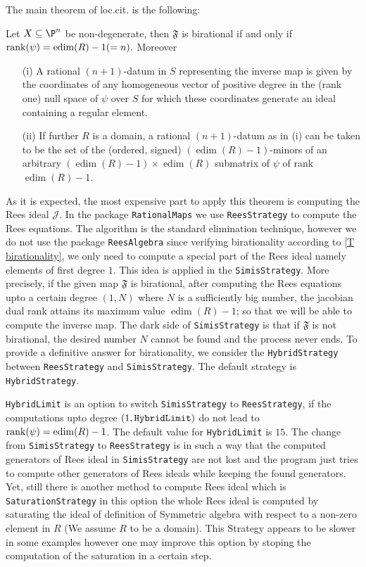 \documentclass[11pt]{amsart}
\numberwithin{equation}{theorem}
\renewcommand{\:}{\colon}
\DeclareMathOperator{\edim}{edim}
\theoremstyle{theorem}
\begin{document}
The main theorem of loc.cit. is the following:
\begin{theorem} \label{T birationality}Let $X\subseteq \P^n$ be non-degenerate, then $\mathfrak{F}$ is birational if and only if ${\rm rank}(\psi)=\edim(R)-1(=n).$
Moreover
\begin{enumerate}
\item[{\rm (i)}] A rational $(n+1)$-datum in
$S$ representing the inverse map is given by the coordinates of any homogeneous vector of positive degree
in the {\rm (}rank one{\rm )} null space of $\psi$ over $S$ for which these coordinates generate an ideal containing
a regular element.

\item[{\rm (ii)}] If further $R$ is a domain, a rational $(n+1)$-datum as in {\rm (i)}
can be taken to be the set of the {\rm (}ordered, signed{\rm )} $(\edim(R)-1)$-minors
of an arbitrary $(\edim(R)-1)\times \edim(R)$ submatrix of $\psi$ of rank $\edim(R)-1$.
\end{enumerate}

\end{theorem}
As it is expected, the most expensive part to apply this theorem is computing the Rees ideal ${\mathcal J}$. In the package {\tt RationalMaps} we use {\tt ReesStrategy} to compute the Rees equations. The algorithm is the standard elimination technique, however we do not use the package {\tt ReesAlgebra} since verifying birationality according to \autoref{T birationality}, we only need to compute a special part of the Rees ideal namely elements of first degree $1$. This idea is applied in the {\tt SimisStrategy}. More precisely, if the given map $\mathfrak{F}$ is birational, after computing the Rees equations upto a certain degree $(1,N)$ where $N$ is a sufficiently big number, the jacobian dual rank attains its maximum value $\edim(R)-1$; so that we will be able to compute the inverse map.  The dark side of {\tt SimisStrategy} is that if $\mathfrak{F}$ is not birational,  the desired number $N$ cannot be found and the process never ends. To provide a definitive answer for birationality,  we consider the {\tt HybridStrategy}  between {\tt ReesStrategy} and {\tt SimisStrategy}.  The default strategy is {\tt HybridStrategy}.

{\tt HybridLimit} is an option to switch   {\tt SimisStrategy} to  {\tt{ReesStrategy}}, if the computations upto degree $(1, \tt{HybridLimit})$ do not lead to   ${\rm rank}(\psi)=\edim(R)-1$.
The default value for {\tt HybridLimit} is $15$. The change from  {\tt SimisStrategy} to  {\tt ReesStrategy} is in such a way that the computed  generators of   Rees ideal  in { \tt SimisStrategy} are not lost and the program just tries to compute other generators of Rees ideals while keeping the found generators.  Yet, still there is another method to compute Rees ideal which is {\tt SaturationStrategy} in this option the whole Rees ideal is computed by saturating the  ideal of definition of Symmetric algebra with respect to a non-zero element in $R$ (We assume $R$ to be a domain). This Strategy appears to be slower in some examples however one may improve this option by stoping the computation of the saturation in a certain step.
\end{document}
